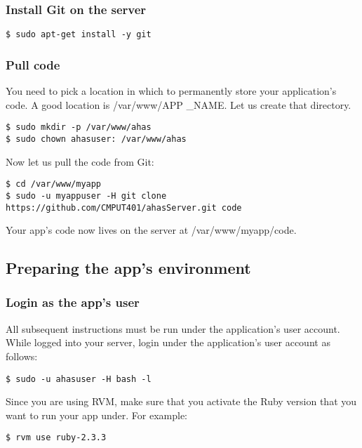 \documentclass[11pt]{article}
\begin{document}
\subsubsection{Install Git on the server}
\label{sec:org26cc820}

\begin{verbatim}
$ sudo apt-get install -y git
\end{verbatim}
\subsubsection{Pull code}
\label{sec:org08a9403}

You need to pick a location in which to permanently store your application's code. A good location is /var/www/APP \_NAME. Let us create that directory.

\begin{verbatim}
$ sudo mkdir -p /var/www/ahas
$ sudo chown ahasuser: /var/www/ahas
\end{verbatim}

Now let us pull the code from Git:

\begin{verbatim}
$ cd /var/www/myapp
$ sudo -u myappuser -H git clone https://github.com/CMPUT401/ahasServer.git code
\end{verbatim}
Your app's code now lives on the server at /var/www/myapp/code.

\subsection{Preparing the app's environment}
\label{sec:orgc84ed4f}

\subsubsection{Login as the app's user}
\label{sec:orgdfde7f7}

All subsequent instructions must be run under the application's user account. While logged into your server, login under the application's user account as follows:

\begin{verbatim}
$ sudo -u ahasuser -H bash -l
\end{verbatim}

Since you are using RVM, make sure that you activate the Ruby version that you want to run your app under. For example:

\begin{verbatim}
$ rvm use ruby-2.3.3
\end{verbatim}
\end{document}
